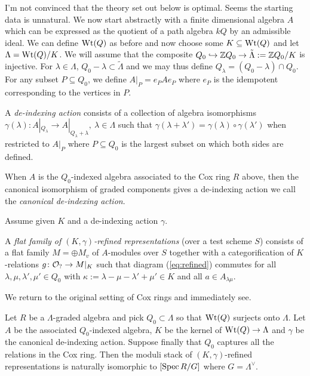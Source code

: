 \documentclass[12pt]{amsart}
\begin{document}
{\red I'm not convinced that the theory set out below is optimal. Seems the starting data is unnatural.}
We now start abstractly with a finite dimensional algebra $A$ which can be expressed as the quotient of a path algebra $kQ$ by an admissible ideal. We can define $\textup{Wt}(Q)$ as before and now choose some $K \subseteq \textup{Wt}(Q)$ and let $\Lambda = \textup{Wt}(Q)/K$. We will assume that the composite $Q_0 \hookrightarrow \mathbb{Z} Q_0 \to \tilde{\Lambda}:= \mathbb{Z} Q_0/K$ is injective. For $\lambda \in \Lambda$, $Q_0 - \lambda \subset \tilde{\Lambda}$ and we may thus define $Q_{\lambda} = (Q_0 - \lambda) \cap Q_0$. For any subset $P \subseteq Q_0$, we define $A|_P = e_P A e_P$ where $e_P$ is the idempotent corresponding to the vertices in $P$. 
\begin{definition}  \label{def:deindexaction}
A {\em de-indexing action} consists of a collection of algebra isomorphisms $\gamma(\lambda) \colon A|_{Q_{\lambda}} \to A|_{Q_{\lambda} + \lambda}, \ \lambda \in \Lambda$ such that $\gamma(\lambda + \lambda') = \gamma(\lambda) \circ \gamma(\lambda')$ when restricted to $A|_P$ where $P\subseteq Q_0$ is the largest subset on which both sides are defined. 
\end{definition}
When $A$ is the $Q_0$-indexed algebra associated to the Cox ring $R$ above, then the canonical isomorphism of graded components gives a de-indexing action we call the {\em canonical de-indexing action}. 

Assume given $K$ and a de-indexing action $\gamma$. 
\begin{definition} \label{def:Kgammarefined}
A {\em flat family of $(K,\gamma)$-refined representations} (over a test scheme $S$) consists of a flat family $M = \oplus M_v$ of $A$-modules over $S$ together with a categorification of $K$-relations $g \colon \mathcal{O}_? \to M|_K$ such that diagram (\ref{eq:refined}) commutes for all $\lambda,\mu,\lambda',\mu' \in Q_0$ with $\kappa :=  \lambda - \mu - \lambda' + \mu' \in K$ and all $a \in A_{\lambda\mu}$. 
\end{definition}

We return to the original setting of Cox rings and immediately see. 
\begin{theorem}
Let $R$ be a $\Lambda$-graded algebra and pick $Q_0 \subset \Lambda$ so that $\textup{Wt}(Q)$ surjects onto $\Lambda$. Let $A$ be the associated $Q_0$-indexed algebra, $K$ be the kernel of $\textup{Wt}(Q) \to \Lambda$ and $\gamma$ be the canonical de-indexing action. Suppose finally that $Q_0$ captures all the relations in the Cox ring. Then the moduli stack of $(K,\gamma)$-refined representations is naturally isomorphic to $[\operatorname{Spec} R/ G]$ where $G = \Lambda^{\vee}$.
\end{theorem}
\end{document}
